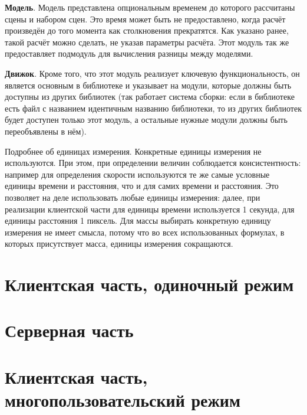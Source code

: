 \textbf{Модель}.\label{modeldescr}
Модель представлена опциональным временем до которого рассчитаны сцены и набором сцен.
Это время может быть не предоставлено, когда расчёт произведён до того момента как столкновения прекратятся.
Как указано ранее, такой расчёт можно сделать, не указав параметры расчёта.
Этот модуль так же предоставляет подмодуль для вычисления разницы между моделями.

\textbf{Движок}.\label{enginedescr}
Кроме того, что этот модуль реализует ключевую функциональность, он является основным в библиотеке и указывает на модули, которые 
должны быть доступны из других библиотек (так работает система сборки:
если в библиотеке есть файл с названием идентичным названию библиотеки, то из других библиотек будет доступен только этот модуль,
а остальные нужные модули должны быть переобъявлены в нём).

\TODO

\TODO Подробнее об единицах измерения. Конкретные единицы измерения не используются.
При этом, при определении величин соблюдается консистентность: например для определения скорости используются
те же самые условные единицы времени и расстояния, что и для самих времени и расстояния. Это позволяет на деле использовать
любые единицы измерения: далее, при реализации клиентской части для единицы времени используется 1 секунда,
для единицы расстояния 1 пиксель. Для массы выбирать конкретную единицу измерения не имеет смысла, потому что во всех
использованных формулах, в которых присутствует масса, единицы измерения сокращаются.

\TODO

\section{Клиентская часть, одиночный режим}\label{clientimpl}

\TODO

\TODO 

\TODO

\section{Серверная часть}\label{serverimpl}

\TODO

\section{Клиентская часть, многопользовательский режим}\label{clientonlineimpl}

\TODO
